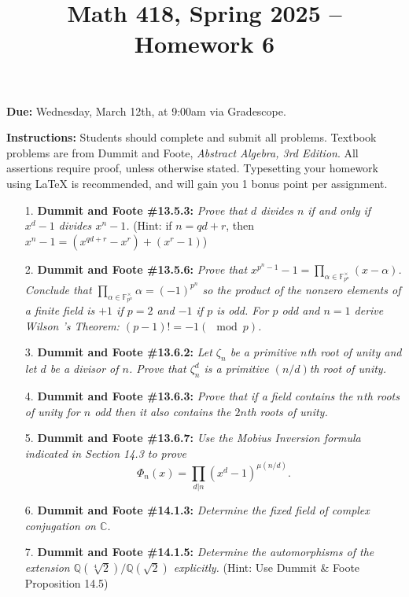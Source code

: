 \documentclass[12pt]{article}
\title{Math 418, Spring 2025 -- Homework 6}
\date{}
\newcommand{\Q}{\mathbb{Q}}
\newcommand{\C}{\mathbb{C}}
\newcommand{\F}{\mathbb{F}}
\begin{document}
 \maketitle
\vspace{-80pt}

\textbf{Due:} Wednesday, March 12th, at 9:00am via Gradescope.

\textbf{Instructions:} Students should complete and submit all problems. Textbook problems are from Dummit and Foote, \emph{Abstract Algebra, 3rd Edition}. All assertions require proof, unless otherwise stated. Typesetting your homework using LaTeX is recommended, and will gain you 1 bonus point per assignment.

\begin{enumerate}

\item[1.] \textbf{Dummit and Foote \#13.5.3:} \textit{Prove that $d$ divides $n$ if and only if $x^d - 1$ divides $x^n - 1$.} (Hint: if $n = qd+r$, then $x^n-1 = (x^{qd+r}-x^r) + (x^r-1)$)

\item[2.] \textbf{Dummit and Foote \#13.5.6:} \textit{Prove that $x^{p^n-1}-1 = \prod_{\alpha\in\F_{p^n}^\times} (x-\alpha)$. Conclude that $\prod_{\alpha\in\F_{p^n}^\times}\alpha = (-1)^{p^n}$ so the product of the nonzero elements of a finite field is $+1$ if $p = 2$ and $-1$ if $p$ is odd. For $p$ odd and $n = 1$ derive Wilson 's Theorem: $(p - 1)! = -1 (\mod p)$.}

\item[3.] \textbf{Dummit and Foote \#13.6.2:} \textit{Let $\zeta_n$ be a primitive $n$th root of unity and let $d$ be a divisor of $n$. Prove that $\zeta_n^d$ is a primitive $(n/d)$th root of unity.}

\item[4.] \textbf{Dummit and Foote \#13.6.3:}  \textit{Prove that if a field contains the $n$th roots of unity for $n$ odd then it also contains the $2n$th roots of unity.}

\item[5.] \textbf{Dummit and Foote \#13.6.7:}  \textit{Use the Mobius Inversion formula indicated in Section 14.3 to prove \[\Phi_n(x) = \prod_{d|n} (x^d-1)^{\mu(n/d)}.\]}

\item[6.] \textbf{Dummit and Foote \#14.1.3:}  \textit{Determine the fixed field of complex conjugation on $\C$.}

\item[7.] \textbf{Dummit and Foote \#14.1.5:}  \textit{Determine the automorphisms of the extension $\Q(\sqrt[4]{2})/\Q(\sqrt{2})$ explicitly.} (Hint: Use Dummit \& Foote Proposition 14.5)

\end{enumerate}
\end{document}
